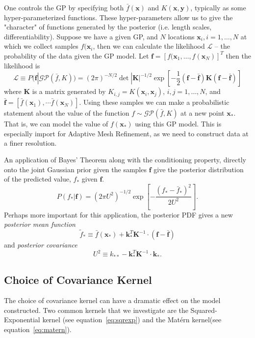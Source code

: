 \documentclass{article}%
\begin{document}
One controls the GP by specifying both $\bar{f}(\mathbf{x})$ and $K(\mathbf{x}, \mathbf{y})$,
typically as some hyper-parameterized functions. These hyper-parameters allow us to give the
"character" of functions generated by the posterior (i.e. length scales, differentiability).
Suppose we have a given GP, and $N$ locations $\mathbf{x}_i, i = 1, \dots, N$ at which we collect
samples $f(\mathbf{x}_i$, then we can calculate the likelihood $\mathcal{L}$ -- the probability of
the data given the GP model. Let
$\mathbf{f} = \left[f(\mathbf{x}_1, \dots, f(\mathbf{x}_N) \right]^T $ then the likelihood is
\begin{equation} 
\mathcal{L} \equiv P(\mathbf{f} | \mathcal{GP}(\bar{f}, K)) = (2\pi)^{-N/2} \det |\mathbf{K}|^{-1/2} 
\exp\left[-\frac{1}{2}\left(\mathbf{f} - \bar{\mathbf{f}}\right)\mathbf{K}
\left(\mathbf{f} - \bar{\mathbf{f}}\right)\right]
\label{eq:likely}
\end{equation}
where $\mathbf{K}$  is a matrix generated by
$K_{i,j} = K(\mathbf{x}_i, \mathbf{x}_j)$, $i, j = 1,\dots, N$,
and $\bar{\mathbf{f}} = [\bar{f}(\mathbf{x}_1), \cdots \bar{f}(\mathbf{x}_N)]$. Using these samples we can make a
probabilistic statement about the value of the function $f \sim \mathcal{GP}(\bar{f}, K)$
at a new point $\mathbf{x}_*$. That is, we can model the value of $f(\mathbf{x}_*)$ using this GP model. This
is especially import for Adaptive Mesh Refinement, as we need to construct data at a finer resolution.

An application of Bayes' Theorem along with the conditioning property, directly onto the joint Gaussian prior
given the samples $\mathbf{f}$ give the posterior distribution of the predicted value, $f_*$ given $\mathbf{f}$.
\begin{equation} 
P(f_* | \mathbf{f}) = (2\pi U^2)^{-1/2} \exp\left[- \frac{(f_* - \bar{f}_*)^2}{2U^2}\right].
\end{equation}
Perhaps more important for this application, the posterior PDF gives a new \textit{posterior mean function}
\begin{equation}
\tilde{f}_* \equiv \bar{f}(\mathbf{x}_*) + \mathbf{k}_*^T\mathbf{K}^{-1}\cdot(\mathbf{f} - \bar{\mathbf{f}})
\label{eq:mean}
\end{equation}
and \textit{posterior covariance}
\begin{equation} 
U^2 \equiv k_{**} - \mathbf{k}_*^T\mathbf{K}^{-1}\cdot\mathbf{k}_*.
\end{equation}

\subsection{Choice of Covariance Kernel} 
The choice of covariance kernel can have a dramatic effect on the model 
constructed. Two common kernels that we investigate are the Squared-Exponential 
kernel (see equation~\ref{eq:sqrexp}) and the Mat\'{e}rn kernel(see equation~\ref{eq:matern}).  
\end{document}
